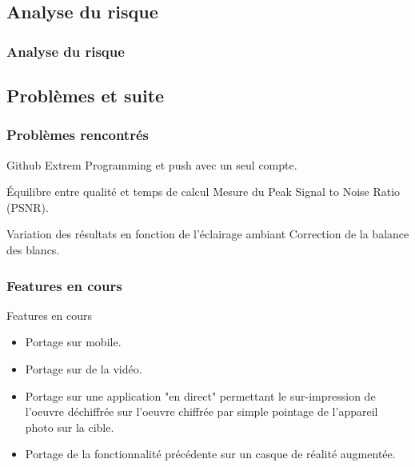     \subsection{Analyse du risque}

        \begin{frame}
            \frametitle{Analyse du risque}
        \end{frame}

    \subsection{Problèmes et suite}

        \begin{frame}
            \frametitle{Problèmes rencontrés}
            \begin{block}{Github}
                Extrem Programming et push avec un seul compte.
            \end{block}
            \begin{block}{Équilibre entre qualité et temps de calcul}
                Mesure du Peak Signal to Noise Ratio (PSNR).
            \end{block}
            \begin{block}{Variation des résultats en fonction de l'éclairage ambiant}
                Correction de la balance des blancs.
            \end{block}
        \end{frame}

        \begin{frame}
            \frametitle{Features en cours}
            \begin{block}{Features en cours}
                \begin{itemize}
                    \item Portage sur mobile.
                    \item Portage sur de la vidéo.
                    \item Portage sur une application "en direct" permettant le sur-impression de l'oeuvre déchiffrée sur l'oeuvre chiffrée par simple pointage de l'appareil photo sur la cible.
                    \item Portage de la fonctionnalité précédente sur un casque de réalité augmentée.
                \end{itemize}
            \end{block}
        \end{frame}

